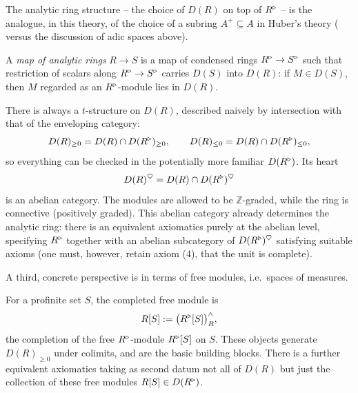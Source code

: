 \begin{remark}[$A^{+}$, revisited]
\label{rmk:1:analytic-analog-of-Aplus}
The analytic ring structure -- the choice of $D(R)$ on top of $R^{\triangleright}$ -- is
the analogue, in this theory, of the choice of a subring $A^{+}\subseteq A$ in
Huber's theory ( versus the discussion of adic spaces
above).
\end{remark}

\begin{definition}
\label{def:1:map-analytic-rings}
A \emph{map of analytic rings} $R\to S$ is a map of condensed rings
$R^{\triangleright}\to S^{\triangleright}$ such that restriction of scalars along $R^{\triangleright}\to S^{\triangleright}$
carries $D(S)$ into $D(R)$: if $M\in D(S)$, then $M$ regarded as an
$R^{\triangleright}$-module lies in $D(R)$.
\end{definition}

\begin{remark}
\label{rmk:1:t-structure}
There is always a $t$-structure on $D(R)$, described naively by intersection with
that of the enveloping category:
\begin{equation*}
D(R)_{\geq 0}=D(R)\cap D(R^{\triangleright})_{\geq 0},\qquad
D(R)_{\leq 0}=D(R)\cap D(R^{\triangleright})_{\leq 0},
\end{equation*}
so everything can be checked in the potentially more familiar $D(R^{\triangleright})$. Its
heart
\[
D(R)^{\heartsuit}=D(R)\cap D(R^{\triangleright})^{\heartsuit}
\]
is an abelian category. The modules are allowed to be $\mathbb{Z}$-graded, while
the ring is connective (positively graded). This abelian category already
determines the analytic ring: there is an equivalent axiomatics purely at the
abelian level, specifying $R^{\triangleright}$ together with an abelian subcategory of
$D(R^{\triangleright})^{\heartsuit}$ satisfying suitable axioms (one must, however, retain
axiom (4), that the unit is complete).
\end{remark}

A third, concrete perspective is in terms of free modules, i.e.\ spaces of
measures.

\begin{definition}
\label{def:1:free-modules}
For a profinite set $S$, the completed free module is
\begin{equation*}
R[S]:=\bigl(R^{\triangleright}[S]\bigr)^{\wedge}_R,
\end{equation*}
the completion of the free $R^{\triangleright}$-module $R^{\triangleright}[S]$ on $S$. These objects
generate $D(R)_{\geq 0}$ under colimits, and are the basic building blocks. There
is a further equivalent axiomatics taking as second datum not all of $D(R)$ but
just the collection of these free modules $R[S]\in D(R^{\triangleright})$.
\end{definition}

